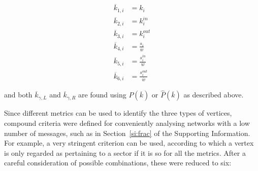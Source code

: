 \documentclass[%
	aip,
	jmp,%
	amsmath,amssymb,
	reprint,%
]{revtex4-1}
\begin{document}
\begin{equation}
	\begin{split}
		\overline{k}_{1,i}&=k_i \\
		\overline{k}_{2,i}&=k_i^{in} \\
		\overline{k}_{3,i}&=k_i^{out} \\
		\overline{k}_{4,i}&=\frac{s_i}{\overline{w}} \\
		\overline{k}_{5,i}&=\frac{s_i^{in}}{\overline{w}} \\
		\overline{k}_{6,i}&=\frac{s_i^{out}}{\overline{w}}
	\end{split}
\end{equation}

\noindent and both $\overline{k}_{\gamma,L}$ and $\overline{k}_{\gamma,R}$ are found using $P(\overline{k})$ or $\hat{P}(\overline{k})$ as described above.

Since different metrics can be used to identify the three types of vertices, compound criteria were defined for conveniently analysing 
networks with a low number of messages,
such as in Section~\ref{si:frac} of the Supporting Information.
For example, a very stringent criterion can be used, according to which a vertex is only regarded as pertaining to a sector if it is so for all the metrics. After a careful consideration of possible combinations, these were reduced to six:
\end{document}
